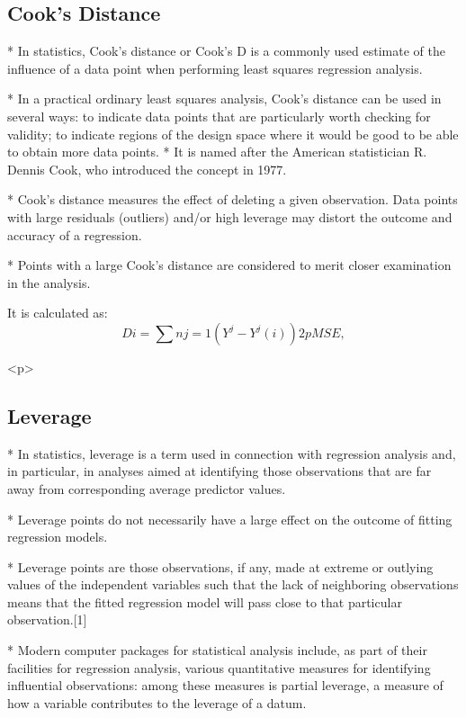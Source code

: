 \documentclass[residuals.tex]{subfiles}
\begin{document}
\subsection*{Cook's Distance}	

* In statistics, Cook's distance or Cook's D is a commonly used estimate of the influence of a data point when performing least squares regression analysis.

* In a practical ordinary least squares analysis, Cook's distance can be used in several ways: to indicate data points that are particularly worth checking for validity; to indicate regions of the design space where it would be good to be able to obtain more data points. 
* 
It is named after the American statistician R. Dennis Cook, who introduced the concept in 1977.
 
* 
Cook's distance measures the effect of deleting a given observation. Data points with large residuals (outliers) and/or high leverage may distort the outcome and accuracy of a regression. 

* Points with a large Cook's distance are considered to merit closer examination in the analysis. 


It is calculated as:
\[
 D i =∑ n j=1 (Y ^  j  −Y ^  j(i) ) 2  p MSE  , 
\]

<p>
\subsection{Leverage}

* In statistics, leverage is a term used in connection with regression analysis and, in particular, in analyses aimed at identifying those observations that are far away from corresponding average predictor values.

*  Leverage points do not necessarily have a large effect on the outcome of fitting regression models.

* Leverage points are those observations, if any, made at extreme or outlying values of the independent variables such that the lack of neighboring observations means that the fitted regression model will pass close to that particular observation.[1]

* Modern computer packages for statistical analysis include, as part of their facilities for regression analysis, various quantitative measures for identifying influential observations: among these measures is partial leverage, a measure of how a variable contributes to the leverage of a datum.
\end{document}

